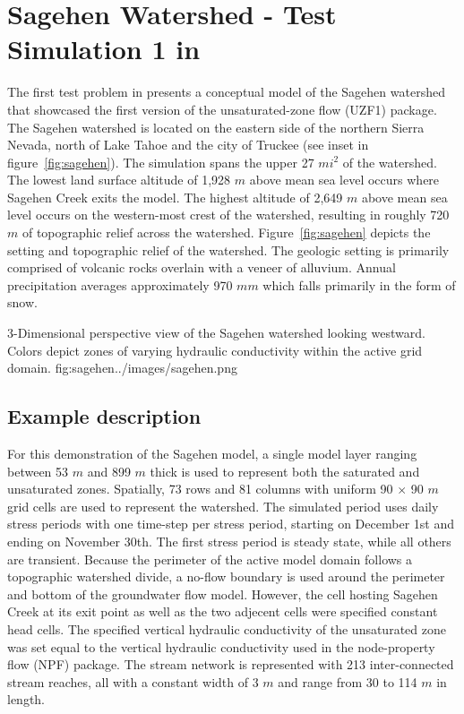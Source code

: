 \section{Sagehen Watershed - Test Simulation 1 in \cite{UZF}}

The first test problem in \cite{UZF} presents a conceptual model of the Sagehen watershed that showcased the first version of the unsaturated-zone flow (UZF1) package. The Sagehen watershed is located on the eastern side of the northern Sierra Nevada, north of Lake Tahoe and the city of Truckee (see inset in figure~\ref{fig:sagehen}). The simulation spans the upper 27 $mi^2$ of the watershed.  The lowest land surface altitude of 1,928 $m$ above mean sea level occurs where Sagehen Creek exits the model.  The highest altitude of 2,649 $m$ above mean sea level occurs on the western-most crest of the watershed, resulting in roughly 720 $m$ of topographic relief across the watershed.  Figure~\ref{fig:sagehen} depicts the setting and topographic relief of the watershed. The geologic setting is primarily comprised of volcanic rocks overlain with a veneer of alluvium. Annual precipitation averages approximately 970 $mm$ which falls primarily in the form of snow.  

\begin{StandardFigure}
	{3-Dimensional perspective view of the Sagehen watershed looking westward.  Colors depict zones of varying hydraulic conductivity within the active grid domain.}
	{fig:sagehen}{../images/sagehen.png}
\end{StandardFigure}

\subsection{Example description}

For this \mf demonstration of the Sagehen model, a single model layer ranging between 53 $m$ and 899 $m$ thick is used to represent both the saturated and unsaturated zones.  Spatially, 73 rows and 81 columns with uniform 90 $\times$ 90 $m$ grid cells are used to represent the watershed.  The simulated period uses daily stress periods with one time-step per stress period, starting on December 1st and ending on November 30th.  The first stress period is steady state, while all others are transient.  Because the perimeter of the active model domain follows a topographic watershed divide, a no-flow boundary is used around the perimeter and bottom of the groundwater flow model.  However, the cell hosting Sagehen Creek at its exit point as well as the two adjecent cells were specified constant head cells.  The specified vertical hydraulic conductivity of the unsaturated zone was set equal to the vertical hydraulic conductivity used in the node-property flow (NPF) package. The stream network is represented with 213 inter-connected stream reaches, all with a constant width of 3 $m$ and range from 30 to 114 $m$ in length.  

